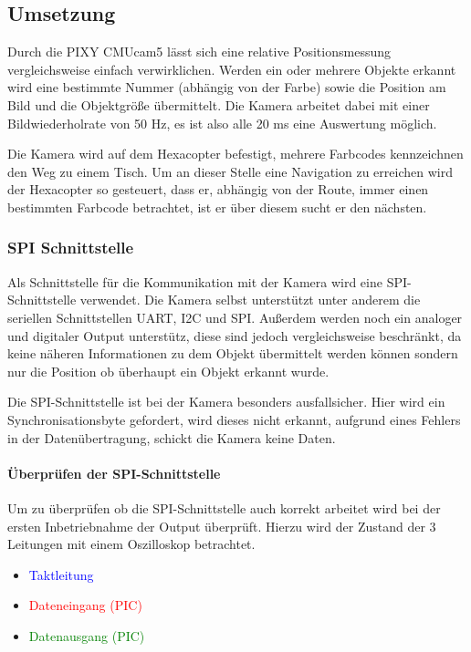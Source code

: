   \subsection{Umsetzung}
  Durch die PIXY CMUcam5 lässt sich eine relative Positionsmessung vergleichsweise einfach verwirklichen.
  Werden ein oder mehrere Objekte erkannt wird eine bestimmte Nummer (abhängig von der Farbe) sowie die Position am Bild und die Objektgröße übermittelt.
  Die Kamera arbeitet dabei mit einer Bildwiederholrate von 50 Hz, es ist also alle 20 ms eine Auswertung möglich.

  Die Kamera wird auf dem Hexacopter befestigt, mehrere Farbcodes kennzeichnen den Weg zu einem Tisch.
  Um an dieser Stelle eine Navigation zu erreichen wird der Hexacopter so gesteuert, dass er, abhängig von der Route,
  immer einen bestimmten Farbcode betrachtet, ist er über diesem sucht er den nächsten.

    \subsubsection{SPI Schnittstelle}
    Als Schnittstelle für die Kommunikation mit der Kamera wird eine SPI-Schnittstelle verwendet.
    Die Kamera selbst unterstützt unter anderem die seriellen Schnittstellen UART, I2C und SPI.
    Außerdem werden noch ein analoger und digitaler Output unterstütz, diese sind jedoch vergleichsweise beschränkt,
    da keine näheren Informationen zu dem Objekt übermittelt werden können sondern nur die Position \bzw ob überhaupt ein Objekt erkannt wurde.

    Die SPI-Schnittstelle ist bei der Kamera besonders ausfallsicher. Hier wird ein Synchronisationsbyte gefordert, wird dieses nicht erkannt,
    \zB aufgrund eines Fehlers in der Datenübertragung, schickt die Kamera keine Daten.

    \paragraph{Überprüfen der SPI-Schnittstelle}
    Um zu überprüfen ob die SPI-Schnittstelle auch korrekt arbeitet wird bei der ersten Inbetriebnahme der Output überprüft.
    Hierzu wird der Zustand der 3 Leitungen mit einem Oszilloskop betrachtet.
    \begin{itemize}
      \item \textcolor{blue}{Taktleitung}
      \item \textcolor{red}{Dateneingang (PIC)}
      \item \textcolor{green}{Datenausgang (PIC)}
    \end{itemize}

